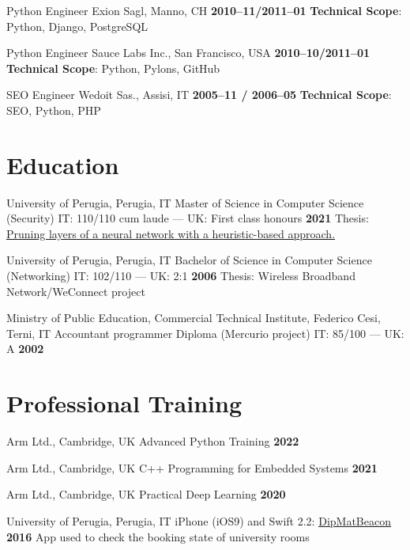 \documentclass[10pt,a4paper,sans]{moderncv}
\begin{document}
    {Python Engineer}
    {Exion Sagl, Manno, CH}
    {\textbf{2010--11/2011--01}}
    {\textbf{Technical Scope}: Python, Django, PostgreSQL}
    {}

    {Python Engineer}
    {Sauce Labs Inc., San Francisco, USA}
    {\textbf{2010--10/2011--01}}
    {\textbf{Technical Scope}: Python, Pylons, GitHub}
    {}

    {SEO Engineer}
    {Wedoit Sas., Assisi, IT}
    {\textbf{2005--11 / 2006--05}}
    {\textbf{Technical Scope}: SEO, Python, PHP}
    {}

\section{Education}

\cventry{}
    {University of Perugia, Perugia, IT}
    {Master of Science in Computer Science (Security) IT\@: 110/110 cum laude
        --- UK\@: First class honours}
    {\textbf{2021}}
    {}
    {Thesis: \href{https://github.com/diegorusso/master-degree-thesis}{Pruning
        layers of a neural network with a heuristic-based approach.}}

\cventry{}
    {University of Perugia, Perugia, IT}
    {Bachelor of Science in Computer Science (Networking) IT\@: 102/110 ---
        UK\@: 2:1}
    {\textbf{2006}}
    {}
    {Thesis: Wireless Broadband Network/WeConnect project}

\cventry{}
    {Ministry of Public Education, Commercial Technical Institute, Federico
        Cesi, Terni, IT}
    {Accountant programmer Diploma (Mercurio project) IT\@: 85/100 --- UK\@: A}
    {\textbf{2002}}
    {}
    {}

\section{Professional Training}

    {Arm Ltd., Cambridge, UK}
    {Advanced Python Training}
    {\textbf{2022}}
    {}
    {}

    {Arm Ltd., Cambridge, UK}
    {C++ Programming for Embedded Systems}
    {\textbf{2021}}
    {}
    {}

    {Arm Ltd., Cambridge, UK}
    {Practical Deep Learning}
    {\textbf{2020}}
    {}
    {}

    {University of Perugia, Perugia, IT}
    {iPhone (iOS9) and Swift 2.2:
        \href{https://github.com/diegorusso/DipMatBeacon}{DipMatBeacon}}
    {\textbf{2016}}
    {App used to check the booking state of university rooms}
    {}
\end{document}

